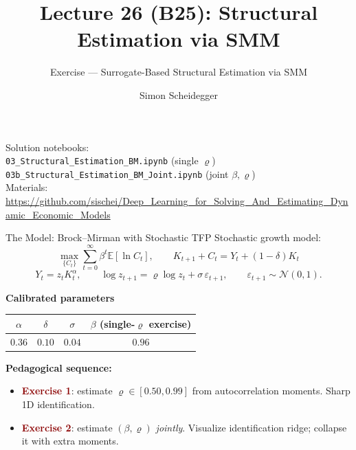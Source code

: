 \documentclass[10pt,aspectratio=169]{beamer}
\title[Lecture 26 (B25)]{Lecture 26 (B25): Structural Estimation via SMM}
\subtitle{Exercise --- Surrogate-Based Structural Estimation via SMM}
\author{Simon Scheidegger}
\institute{HEC, University of Lausanne}
\date{}
\newcommand{\E}[1]{\mathbb{E}\!\left[#1\right]}
\newcommand{\emphc}[1]{\textbf{\textcolor{darkred}{#1}}}
\begin{document}
{
\begin{frame}
\titlepage
\vspace{-0.3cm}
\begin{center}
{\footnotesize Solution notebooks:}\\[1pt]
{\footnotesize \texttt{03\_Structural\_Estimation\_BM.ipynb} (single $\varrho$)}\\
{\footnotesize \texttt{03b\_Structural\_Estimation\_BM\_Joint.ipynb} (joint $\beta,\varrho$)}\\[2pt]
{\footnotesize Materials: \url{https://github.com/sischei/Deep_Learning_for_Solving_And_Estimating_Dynamic_Economic_Models}}
\end{center}
\end{frame}
}

\begin{frame}{The Model: Brock--Mirman with Stochastic TFP}
\small
Stochastic growth model:
\vspace{-4pt}
\[
\max_{\{C_t\}} \sum_{t=0}^{\infty} \beta^t \E{\ln C_t}, \qquad
K_{t+1} + C_t = Y_t + (1-\delta)K_t
\]
\vspace{-12pt}
\[
Y_t = z_t K_t^\alpha, \qquad \log z_{t+1} = \varrho\log z_t + \sigma\,\varepsilon_{t+1}, \qquad \varepsilon_{t+1}\sim\mathcal{N}(0,1).
\]

\textbf{Calibrated parameters}
\begin{center}\begin{tabular}{cccc}
\toprule
$\alpha$ & $\delta$ & $\sigma$ & $\beta$ (single-$\varrho$ exercise) \\
\midrule
$0.36$ & $0.10$ & $0.04$ & $0.96$ \\
\bottomrule
\end{tabular}\end{center}

\textbf{Pedagogical sequence:}
\begin{itemize}
\itemsep0pt
\item \emphc{Exercise 1}: estimate $\varrho \in [0.50, 0.99]$ from autocorrelation moments. Sharp 1D identification.
\item \emphc{Exercise 2}: estimate $(\beta, \varrho)$ \emph{jointly}. Visualize identification ridge; collapse it with extra moments.
\end{itemize}
\end{frame}
\end{document}
